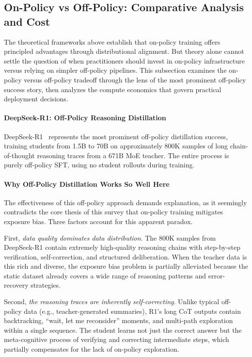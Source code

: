\documentclass{article} %
\begin{document}
\subsection{On-Policy vs Off-Policy: Comparative Analysis and Cost}
\label{subsec:onpolicy_vs_offpolicy}

The theoretical frameworks above establish that on-policy training offers principled advantages through distributional alignment. But theory alone cannot settle the question of when practitioners should invest in on-policy infrastructure versus relying on simpler off-policy pipelines. This subsection examines the on-policy versus off-policy tradeoff through the lens of the most prominent off-policy success story, then analyzes the compute economics that govern practical deployment decisions.

\paragraph{DeepSeek-R1: Off-Policy Reasoning Distillation}
DeepSeek-R1~\citep{2501.12948} represents the most prominent off-policy distillation success, training students from 1.5B to 70B on approximately 800K samples of long chain-of-thought reasoning traces from a 671B MoE teacher. The entire process is purely off-policy SFT, using no student rollouts during training.

\paragraph{Why Off-Policy Distillation Works So Well Here}
The effectiveness of this off-policy approach demands explanation, as it seemingly contradicts the core thesis of this survey that on-policy training mitigates exposure bias. Three factors account for this apparent paradox.

First, \emph{data quality dominates data distribution}. The 800K samples from DeepSeek-R1 contain extremely high-quality reasoning chains with step-by-step verification, self-correction, and structured deliberation. When the teacher data is this rich and diverse, the exposure bias problem is partially alleviated because the static dataset already covers a wide range of reasoning patterns and error-recovery strategies.

Second, \emph{the reasoning traces are inherently self-correcting}. Unlike typical off-policy data (e.g., teacher-generated summaries), R1's long CoT outputs contain backtracking, ``wait, let me reconsider'' moments, and multi-path exploration within a single sequence. The student learns not just the correct answer but the meta-cognitive process of verifying and correcting intermediate steps, which partially compensates for the lack of on-policy exploration.
\end{document}
